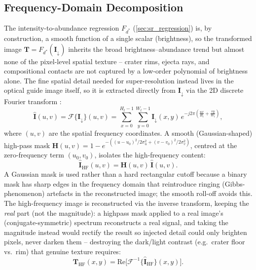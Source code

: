 \documentclass[journal,lettersize]{IEEEtran}
\begin{document}
\subsection{Frequency-Domain Decomposition}\label{sec:sr_fft}

The intensity-to-abundance regression $F_{d^*}$ (\cref{sec:sr_regression})
is, by construction, a smooth function of a single scalar (brightness),
so the transformed image $\mathbf{T} = F_{d^*}(\mathbf{I}_\downarrow)$
inherits the broad brightness--abundance trend but almost none of the
pixel-level spatial texture -- crater rims, ejecta rays, and compositional
contacts are not captured by a low-order polynomial of brightness alone.
The fine spatial detail needed for super-resolution instead lives in the
optical guide image itself, so it is extracted directly from
$\mathbf{I}_\downarrow$ via the 2D discrete Fourier transform
\cite{Smith1997}:
\begin{equation}\label{eq:fft}
  \hat{\mathbf{I}}(u,v) = \mathcal{F}\{\mathbf{I}_\downarrow\}(u,v)
  = \sum_{x=0}^{H_t-1}\sum_{y=0}^{W_t-1}
    \mathbf{I}_\downarrow(x,y)\,
    e^{-j2\pi\!\left(\frac{ux}{H_t} + \frac{vy}{W_t}\right)},
\end{equation}
where $(u,v)$ are the spatial frequency coordinates. A smooth
(Gaussian-shaped) high-pass mask $\mathbf{H}(u,v) = 1 - e^{-\left(
(u-u_0)^2/2\sigma_u^2 + (v-v_0)^2/2\sigma_v^2\right)}$, centred at the
zero-frequency term $(u_0,v_0)$, isolates the high-frequency content:
\begin{equation}\label{eq:highpass}
  \hat{\mathbf{I}}_{\mathrm{HF}}(u,v)
    = \mathbf{H}(u,v)\,\hat{\mathbf{I}}(u,v).
\end{equation}
A Gaussian mask is used rather than a hard rectangular cutoff because a
binary mask has sharp edges in the frequency domain that reintroduce
ringing (Gibbs-phenomenon) artefacts in the reconstructed image; the
smooth roll-off avoids this. The high-frequency image is reconstructed
via the inverse transform, keeping the \emph{real} part (not the
magnitude): a highpass mask applied to a real image's (conjugate-symmetric)
spectrum reconstructs a real signal, and taking the magnitude instead would
rectify the result so injected detail could only brighten pixels, never
darken them -- destroying the dark/light contrast (e.g.\ crater floor vs.\
rim) that genuine texture requires:
\begin{equation}\label{eq:ifft}
  \mathbf{T}_{\mathrm{HF}}(x,y)
    = \mathrm{Re}\bigl[\mathcal{F}^{-1}\!\bigl\{\hat{\mathbf{I}}_{\mathrm{HF}}\bigr\}(x,y)\bigr].
\end{equation}
\end{document}
